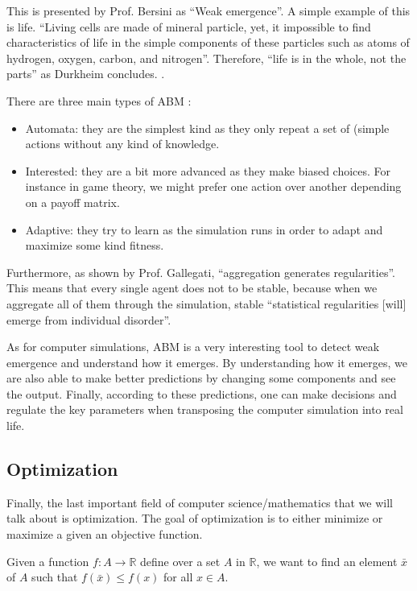     This is presented by Prof. Bersini as ``Weak emergence''.\cite{ctaiABMBersini} A simple example of this is life. ``Living cells are made of mineral particle, yet, it impossible to find characteristics of life in the simple components of these particles such as atoms of hydrogen, oxygen, carbon, and nitrogen''. Therefore, ``life is in the whole, not the parts'' as Durkheim concludes. \cite{ctaiABMBersini}.

    There are three main types of ABM \cite{ctaiABMBersini} :

    \begin{itemize}
        \item Automata: they are the simplest kind as they only repeat a set of (simple actions without any kind of knowledge. 
        \item Interested: they are a bit more advanced as they make biased choices. For instance in game theory, we might prefer one action over another depending on a payoff matrix.
        \item Adaptive: they try to learn as the simulation runs in order to adapt and maximize some kind fitness.
    \end{itemize}

    Furthermore, as shown by Prof. Gallegati, ``aggregation generates regularities''. This means that every single agent does not to be stable, because when we aggregate all of them through the simulation, stable ``statistical regularities [will] emerge from individual disorder''. \cite{MauroGallegati}

    As for computer simulations, ABM is a very interesting tool to detect weak emergence and understand how it emerges. By understanding how it emerges, we are also able to make better predictions by changing some components and see the output. Finally, according to these predictions, one can make decisions and regulate the key parameters when transposing the computer simulation into real life. \cite{ctaiABMBersini}

\subsection{Optimization}

    Finally, the last important field of computer science/mathematics that we will talk about is optimization. The goal of optimization is to either minimize or maximize a given an objective function. 

    Given a function $f : A \rightarrow \mathbb{R}$ define over a set $A$ in $\mathbb{R}$, we want to find an element $\bar{x} $ of $A$ such that $f(\bar{x}) \leq f(x)$ for all $x \in A$.

